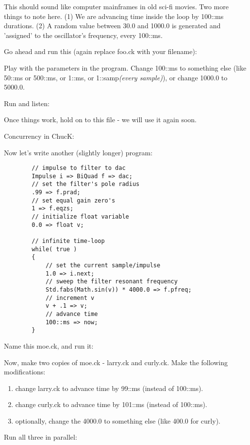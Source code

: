 This should sound like computer mainframes in old sci-fi movies. Two more things to note here. (1) We are advancing time inside the loop by 100::ms durations. (2) A random value between 30.0 and 1000.0 is generated and 'assigned' to the oscillator's frequency, every 100::ms. 

Go ahead and run this (again replace foo.ck with your filename):

Play with the parameters in the program. Change 100::ms to something else (like 50::ms or 500::ms, or 1::ms, or 1::samp\textit{(every sample)}), or change 1000.0 to 5000.0. 

Run and listen:

Once things work, hold on to this file - we will use it again soon. 

Concurrency in ChucK: 

Now let's write another (slightly longer) program:
\begin{verbatim}
        // impulse to filter to dac
        Impulse i => BiQuad f => dac;
        // set the filter's pole radius
        .99 => f.prad;
        // set equal gain zero's
        1 => f.eqzs;
        // initialize float variable
        0.0 => float v;

        // infinite time-loop
        while( true )
        {
            // set the current sample/impulse
            1.0 => i.next;
            // sweep the filter resonant frequency
            Std.fabs(Math.sin(v)) * 4000.0 => f.pfreq;
            // increment v
            v + .1 => v;
            // advance time
            100::ms => now;
        }
\end{verbatim}

Name this moe.ck, and run it:

Now, make two copies of moe.ck - larry.ck and curly.ck. Make the following modifications:
\begin{enumerate}
\item change larry.ck to advance time by 99::ms (instead of 100::ms).
\item change curly.ck to advance time by 101::ms (instead of 100::ms). 
\item optionally, change the 4000.0 to something else (like 400.0 for curly). 
\end{enumerate}

Run all three in parallel:

